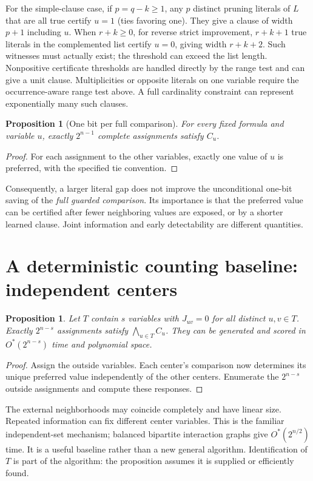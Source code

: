 \documentclass[11pt,a4paper]{article}
\newtheorem{proposition}[theorem]{Proposition}
\theoremstyle{remark}
\newcommand{\Ostar}{O^{*}}
\begin{document}
For the simple-clause case, if $p=q-k\ge1$, any $p$ distinct pruning
literals of $L$ that are all true certify $u=1$ (ties favoring one).
They give a clause of width $p+1$ including $u$. When $r+k\ge0$, for reverse
strict improvement, $r+k+1$ true literals in the complemented list certify
$u=0$, giving width $r+k+2$. Such witnesses must actually exist; the
threshold can exceed the list length. Nonpositive certificate thresholds
are handled directly by the range test and can give a unit clause.
Multiplicities or opposite literals
on one variable require the occurrence-aware range test above. A full
cardinality constraint can represent exponentially many such clauses.

\begin{proposition}[One bit per full comparison]\label{prop:half}
For every fixed formula and variable $u$, exactly $2^{n-1}$ complete
assignments satisfy $C_u$.
\end{proposition}
\begin{proof}
For each assignment to the other variables, exactly one value of $u$
is preferred, with the specified tie convention.
\end{proof}

Consequently, a larger literal gap does not improve the unconditional
one-bit saving of the \emph{full guarded comparison}. Its importance is
that the preferred value can be certified after fewer neighboring values
are exposed, or by a shorter learned clause. Joint information and
early detectability are different quantities.

\section{A deterministic counting baseline: independent centers}

\begin{proposition}\label{prop:independent}
Let $T$ contain $s$ variables with $J_{uv}=0$ for all distinct $u,v\in T$.
Exactly $2^{n-s}$ assignments satisfy $\bigwedge_{u\in T}C_u$.
They can be generated and scored in $\Ostar(2^{n-s})$ time and
polynomial space.
\end{proposition}
\begin{proof}
Assign the outside variables. Each center's comparison now determines
its unique preferred value independently of the other centers. Enumerate
the $2^{n-s}$ outside assignments and compute these responses.
\end{proof}

The external neighborhoods may coincide completely and have linear size.
Repeated information can fix different center variables. This is the
familiar independent-set mechanism; balanced bipartite interaction
graphs give $\Ostar(2^{n/2})$ time. It is a useful baseline rather than
a new general algorithm. Identification of $T$ is part of the algorithm:
the proposition assumes it is supplied or efficiently found.
\end{document}
